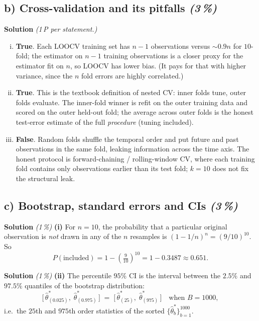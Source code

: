 \documentclass[11pt,a4paper]{article}
\newcommand{\subpoints}[1]{\textit{(#1\,\%)}}
\newcommand{\sol}{\noindent\textbf{Solution}}
\begin{document}
\subsection*{b) Cross-validation and its pitfalls \subpoints{3}}
\sol{} \emph{(1\,P per statement.)}
\begin{enumerate}[(i)]
  \item \textbf{True}. Each LOOCV training set has $n-1$ observations versus $\sim 0.9 n$ for
        $10$-fold; the estimator on $n-1$ training observations is a closer proxy for the estimator
        fit on $n$, so LOOCV has lower bias. (It pays for that with higher variance, since the $n$
        fold errors are highly correlated.)
  \item \textbf{True}. This is the textbook definition of nested CV: inner folds tune, outer folds
        evaluate. The inner-fold winner is refit on the outer training data and scored on the outer
        held-out fold; the average across outer folds is the honest test-error estimate of the
        full \emph{procedure} (tuning included).
  \item \textbf{False}. Random folds shuffle the temporal order and put future and past
        observations in the same fold, leaking information across the time axis. The honest
        protocol is forward-chaining / rolling-window CV, where each training fold contains only
        observations earlier than its test fold; $k=10$ does not fix the structural leak.
\end{enumerate}

\subsection*{c) Bootstrap, standard errors and CIs \subpoints{3}}

\sol{} \subpoints{1} \textbf{(i)} For $n=10$, the probability that a particular original observation
is \emph{not} drawn in any of the $n$ resamples is $(1-1/n)^n = (9/10)^{10}$. So
$$P(\text{included}) = 1 - \left(\tfrac{9}{10}\right)^{10} = 1 - 0.3487 \approx \boxed{0.651}.$$

\medskip
\sol{} \subpoints{1} \textbf{(ii)} The percentile $95\%$ CI is the interval between the
$\mathbf{2.5\%}$ and $\mathbf{97.5\%}$ quantiles of the bootstrap distribution:
$$\bigl[\,\hat\theta^*_{(0.025)},\;\hat\theta^*_{(0.975)}\,\bigr]
   \;=\; \bigl[\,\hat\theta^*_{(25)},\;\hat\theta^*_{(975)}\,\bigr]\quad\text{when }B=1000,$$
i.e.\ the $25$th and $975$th order statistics of the sorted $\{\hat\theta^*_b\}_{b=1}^{1000}$.
\end{document}
